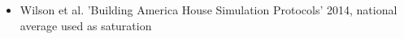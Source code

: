 \begin{itemize}
\item Wilson et al. 'Building America House Simulation Protocols' 2014, national average used as saturation
\end{itemize}
